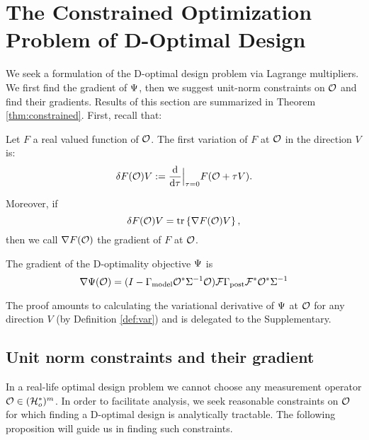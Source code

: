 \section{The Constrained Optimization Problem of D-Optimal Design}\label{section:D_and_grad}
We seek a formulation of the D-optimal design problem via Lagrange
multipliers. We first find the gradient of $\Psi$, then we suggest
unit-norm constraints on $\mathcal{O}$ and find their gradients. Results of
this section are summarized in Theorem \ref{thm:constrained}. First,
recall that:
\begin{definition}\label{def:var}
  Let $F$ a real valued function of $\mathcal{O}$. The first variation of $F$
  at $\mathcal{O}$ in the direction $V$ is:
  \begin{equation*}
    \delta F(\obs) V := \frac{\der}{\der \tau}\Big |_{\tau=0}  F( \obs + \tau V).
  \end{equation*}

  Moreover, if
  \begin{equation*}
    \delta F(\obs) V = \tr{\nabla F(\obs) V},
  \end{equation*}
  then we call $\nabla F(\mathcal{O})$ the gradient of $F$ at $\mathcal{O}$. 
\end{definition}




\begin{proposition}\label{prop:tar_grad}
  The gradient of the D-optimality objective $\Psi$ is
  \begin{equation*}
    \nabla \tar(\obs) = ( I - \modcov \obs^* \Sigma^{-1}\obs ) \fwd
    \postcov \fwd^* \obs^* \Sigma^{-1}
  \end{equation*}
\end{proposition}

The proof amounts to calculating the variational derivative of $\Psi$
at $\mathcal{O}$ for any direction $V$ (by Definition \ref{def:var}) and is
delegated to the Supplementary.


\subsection{Unit norm constraints and their gradient}
In a real-life optimal design problem we cannot choose any measurement
operator $\mathcal{O} \in (\mathcal{H}_o^*)^m$. In order to facilitate analysis, we
seek reasonable constraints on $\mathcal{O}$ for which finding a D-optimal
design is analytically tractable. The following proposition will guide
us in finding such constraints.

